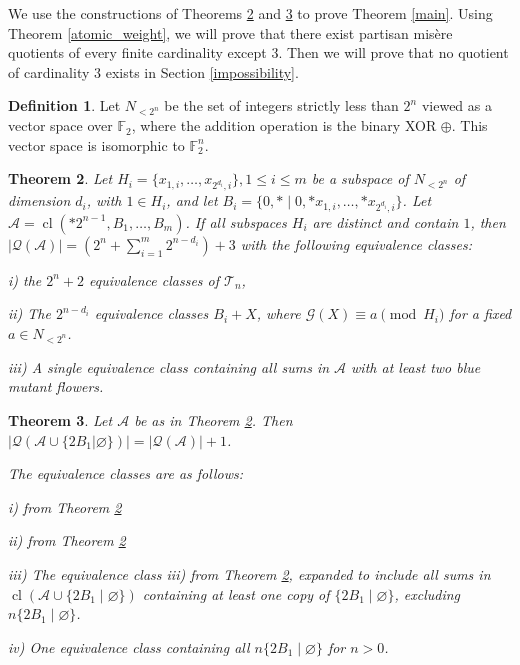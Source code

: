 \documentclass{amsart}
\theoremstyle{plain}
\newtheorem{thm}{Theorem}
\theoremstyle{definition}
\newtheorem{defn}[thm]{Definition}
\theoremstyle{remark}
\numberwithin{equation}{section}
\numberwithin{thm}{section}
\DeclareMathOperator{\cl}{cl}
\begin{document}
We use the constructions of Theorems \ref{quotientsize} and \ref{quotientsize2} to prove Theorem \ref{main}.
Using Theorem \ref{atomic_weight}, we will prove that there exist partisan mis\`ere quotients of every finite cardinality except $3$. Then we will prove that no quotient of cardinality $3$ exists in Section \ref{impossibility}. 

\begin{defn}
    Let $N_{<2^n}$ be the set of integers strictly less than $2^n$ viewed as a vector space over $\mathbb{F}_2$, where the addition  operation is the binary XOR $\oplus$. This vector space is isomorphic to $\mathbb{F}_2^n$.
\end{defn}
\begin{thm}
    \label{quotientsize}
    Let $H_i = \{x_{1,i},\dots,x_{2^{d_i},i}\}, 1 \leq i \leq m$ be a subspace of  $N_{<2^n}$ of dimension $d_i$, with $1 \in H_i$, and let $B_i = \{0,*\mid 0,*x_{1,i},\ldots,*x_{2^{d_i},i}\}$. Let $\mathscr{A} = \cl( *2^{n-1},B_1,\ldots,B_m ) $. If all subspaces $H_i$ are distinct and contain $1$, then $\left |\mathcal{Q} (\mathscr{A})\right | = \left( 2^n +\sum_{i=1}^m 2^{n-d_i} \right) +3 $ with the following equivalence classes:

i) the $2^n+2$ equivalence classes of $\mathscr{T}_n$,

ii) The $2^{n-d_i}$ equivalence classes $B_i + X$, where $\mathcal{G}(X) \equiv a \pmod {H_i}$ for a fixed $a \in N_{<2^n}$.

iii) A single equivalence class containing all sums in $\mathscr{A}$ with at least two blue mutant flowers.
\end{thm}


\begin{thm}
\label{quotientsize2}
    Let $\mathscr{A}$ be as in Theorem \ref{quotientsize}. Then $\left|\mathcal{Q} ( \mathscr{A} \cup \{2B_1 | \varnothing\})\right|  = \left |\mathcal{Q} (\mathscr{A})\right |+1$.

    The equivalence classes are as follows: 

    i) from Theorem \ref{quotientsize}

    ii) from Theorem \ref{quotientsize}

    iii) The equivalence class iii) from Theorem \ref{quotientsize}, expanded to include all sums in $\cl(\mathscr{A} \cup \{2B_1 \mid \varnothing\})$ containing at least one copy of $\{2B_1 \mid \varnothing\}$, excluding $n\{2B_1 \mid \varnothing\}$.

    iv) One equivalence class containing all $n\{2B_1 \mid \varnothing\}$ for $n>0$.
\end{thm}
\end{document}
